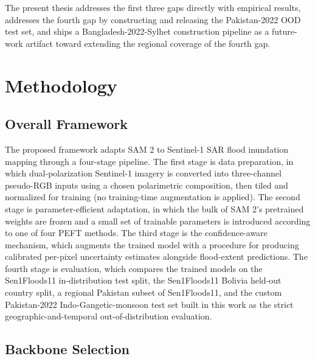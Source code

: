 \documentclass[11pt,a4paper,oneside]{report}
\begin{document}
The present thesis addresses the first three gaps directly with empirical results, addresses the fourth gap by constructing and releasing the Pakistan-2022 OOD test set, and ships a Bangladesh-2022-Sylhet construction pipeline as a future-work artifact toward extending the regional coverage of the fourth gap.

\chapter{Methodology}
\label{chap:methodology}

\section{Overall Framework}

The proposed framework adapts SAM 2 to Sentinel-1 SAR flood inundation mapping through a four-stage pipeline. The first stage is data preparation, in which dual-polarization Sentinel-1 imagery is converted into three-channel pseudo-RGB inputs using a chosen polarimetric composition, then tiled and normalized for training (no training-time augmentation is applied). The second stage is parameter-efficient adaptation, in which the bulk of SAM 2's pretrained weights are frozen and a small set of trainable parameters is introduced according to one of four PEFT methods. The third stage is the confidence-aware mechanism, which augments the trained model with a procedure for producing calibrated per-pixel uncertainty estimates alongside flood-extent predictions. The fourth stage is evaluation, which compares the trained models on the Sen1Floods11 in-distribution test split, the Sen1Floods11 Bolivia held-out country split, a regional Pakistan subset of Sen1Floods11, and the custom Pakistan-2022 Indo-Gangetic-monsoon test set built in this work as the strict geographic-and-temporal out-of-distribution evaluation.

\section{Backbone Selection}
\end{document}

